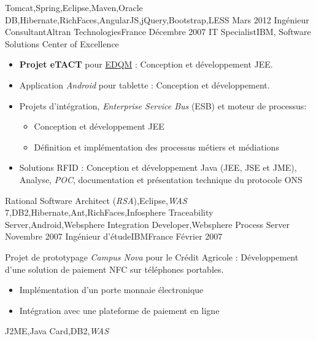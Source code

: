 \begin{experiences}
{                    }
                    {Tomcat,Spring,Eclipse,Maven,Oracle DB,Hibernate,RichFaces,AngularJS,jQuery,Bootstrap,LESS}
  \emptySeparator
  \consultantexperience
  {Mars 2012}       {Ingénieur Consultant}{Altran Technologies}{France}
  {Décembre 2007}   {IT Specialist}{IBM, Software Solutions Center of Excellence}
                    {
                      \begin{itemize}
                        \item \textbf{Projet eTACT} pour \href{https://www.edqm.eu/fr/contexte-mission-cd-p-phcmed.html}{EDQM} : Conception et développement JEE.
                        \item Application \emph{Android} pour tablette : Conception et développement.
                        \item Projets d'intégration, \emph{Enterprise Service Bus} (ESB) et moteur de processus:
                        \begin{itemize}
                          \item Conception et développement JEE
                          \item Définition et implémentation des processus métiers et médiations
                        \end{itemize}
                        \item Solutions RFID : Conception et développement Java (JEE, JSE et JME), Analyse, \emph{POC}, documentation et présentation technique du protocole ONS
                      \end{itemize}
                    }
                    {Rational Software Architect (\emph{RSA}),Eclipse,\emph{WAS} 7,DB2,Hibernate,Ant,RichFaces,Infosphere Traceability Server,Android,Websphere Integration Developer,Websphere Process Server}
  \emptySeparator         
  \experience
  {Novembre 2007}  {Ingénieur d'étude}{IBM}{France}
  {Février 2007}   {
                      Projet de prototypage \emph{Campus Nova} pour le Crédit Agricole : Développement d'une solution de paiement NFC sur téléphones portables.  
                      \begin{itemize}
                        \item Implémentation d'un porte monnaie électronique                                            
                        \item Intégration avec une plateforme de paiement en ligne  
                      \end{itemize}
                  }
                  {J2ME,Java Card,DB2,\emph{WAS}}  
\end{experiences}
